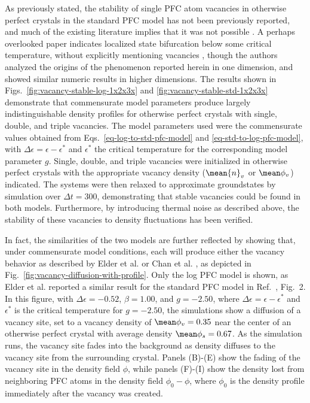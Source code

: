 As previously stated, the stability of single PFC atom vacancies in otherwise perfect crystals in the standard PFC model has not been previously reported, and much of the existing literature implies that it was not possible \cite{elder2002modeling, chan2009vacancy}. A perhaps overlooked paper indicates localized state bifurcation below some critical temperature, without explicitly mentioning vacancies \cite{thiele2013localized-389}, though the authors analyzed the origins of the phenomenon reported herein in one dimension, and showed similar numeric results in higher dimensions. The results shown in Figs.~\ref{fig:vacancy-stable-log-1x2x3x} and \ref{fig:vacancy-stable-std-1x2x3x} demonstrate that commensurate model parameters produce largely indistinguishable density profiles for otherwise perfect crystals with single, double, and triple vacancies.  The model parameters used were the commensurate values obtained from Eqs.~\ref{eq-log-to-std-pfc-model} and \ref{eq-std-to-log-pfc-model}, with $\Delta \epsilon = \epsilon - \epsilon^*$ and $\epsilon^*$ the critical temperature for the corresponding model parameter $g$.  Single, double, and triple vacancies were initialized in otherwise perfect crystals with the appropriate vacancy density ($\mean{n}_v$ or $\mean\phi_v$) indicated.  The systems were then relaxed to approximate groundstates by simulation over $\Delta t = 300$, demonstrating that stable vacancies could be found in both models.  Furthermore, by introducing thermal noise as described above, the stability of these vacancies to density fluctuations has been verified.

In fact, the similarities of the two models are further reflected by showing that, under commensurate model conditions, each will produce either the vacancy behavior as described by Elder et al. \cite{elder2002modeling} or Chan et al. \cite{chan2009vacancy}, as depicted in Fig.~\ref{fig:vacancy-diffusion-with-profile}.  Only the log PFC model is shown, as Elder et al. reported a similar result for the standard PFC model in Ref.~\cite{elder2002modeling}, Fig.~2.  In this figure, with $\Delta\epsilon = -0.52$, $\beta = 1.00$, and $g = -2.50$, where $\Delta \epsilon = \epsilon - \epsilon^*$ and $\epsilon^*$ is the critical temperature for $g=-2.50$, the simulations show a diffusion of a vacancy site, set to a vacancy density of $\mean\phi_v = 0.35$ near the center of an otherwise perfect crystal with average density $\mean\phi_s = 0.67$.  As the simulation runs, the vacancy site fades into the background as density diffuses to the vacancy site from the surrounding crystal.  Panels (B)-(E) show the fading of the vacancy site in the density field $\phi$, while panels (F)-(I) show the density lost from neighboring PFC atoms in the density field $\phi_0 - \phi$, where $\phi_0$ is the density profile immediately after the vacancy was created.

